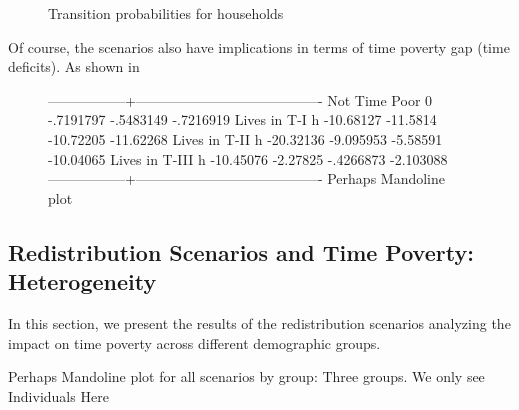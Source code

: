 \documentclass[
  11pt,
]{article}
\begin{document}
\begin{figure}


\caption{\label{fig-transition2}Transition probabilities for households}

\end{figure}%

Of course, the scenarios also have implications in terms of time poverty
gap (time deficits). As shown in

\begin{figure}


\caption{\label{fig-transition}-----------------+----------------------------------------
Not Time Poor \textbar{} 0 -.7191797 -.5483149 -.7216919 Lives in T-I h
\textbar{} -10.68127 -11.5814 -10.72205 -11.62268 Lives in T-II h
\textbar{} -20.32136 -9.095953 -5.58591 -10.04065 Lives in T-III h
\textbar{} -10.45076 -2.27825 -.4266873 -2.103088
-----------------+---------------------------------------- Perhaps
Mandoline plot}

\end{figure}%

\subsection{Redistribution Scenarios and Time Poverty:
Heterogeneity}\label{redistribution-scenarios-and-time-poverty-heterogeneity}

In this section, we present the results of the redistribution scenarios
analyzing the impact on time poverty across different demographic
groups.

Perhaps Mandoline plot for all scenarios by group: Three groups. We only
see Individuals Here
\end{document}
